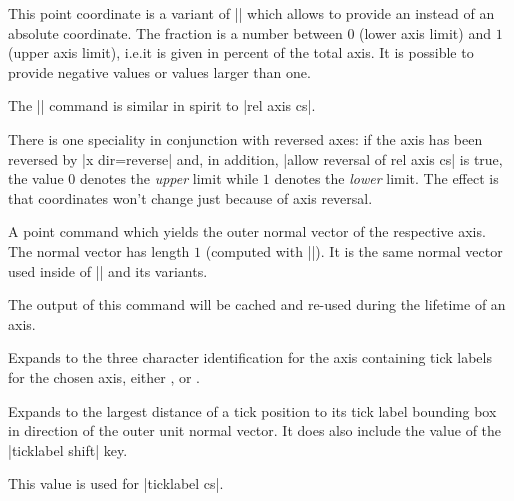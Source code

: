 \begin{command}{\pgfplotsqpointoutsideofaxisrel%
}
    This point coordinate is a variant of |\pgfplotsqpointoutsideofaxis| which
    allows to provide an  instead of an absolute
    coordinate. The fraction is a number between $0$ (lower axis limit) and $1$
    (upper axis limit), i.e.\@ it is given in percent of the total axis. It is
    possible to provide negative values or values larger than one.

    The |\pgfplotsqpointoutsideofaxisrel| command is similar in spirit to
    |rel axis cs|.

    There is one speciality in conjunction with reversed axes: if the axis has
    been reversed by |x dir=reverse| and, in addition,
    |allow reversal of rel axis cs| is true, the value $0$ denotes the
    \emph{upper} limit while $1$ denotes the \emph{lower} limit. The effect is
    that coordinates won't change just because of axis reversal.
\end{command}

\begin{command}{\pgfplotspointouternormalvectorofaxis{}}
    A point command which yields the outer normal vector of the respective
    axis. The normal vector has length $1$ (computed with
    |\pgfpointnormalised|). It is the same normal vector used inside of
    |\pgfplotsqpointoutsideofaxis| and its variants.

    The output of this command will be cached and re-used during the lifetime
    of an axis.
\end{command}

\begin{command}{\pgfplotsticklabelaxisspec{}}
    Expands to the three character identification for the axis containing tick
    labels for the chosen axis, either ,  or .
\end{command}

\begin{command}{\pgfplotsvalueoflargesttickdimen{}}
    Expands to the largest distance of a tick position to its tick label
    bounding box in direction of the outer unit normal vector. It does also
    include the value of the |ticklabel shift| key.

    This value is used for |ticklabel cs|.
\end{command}

